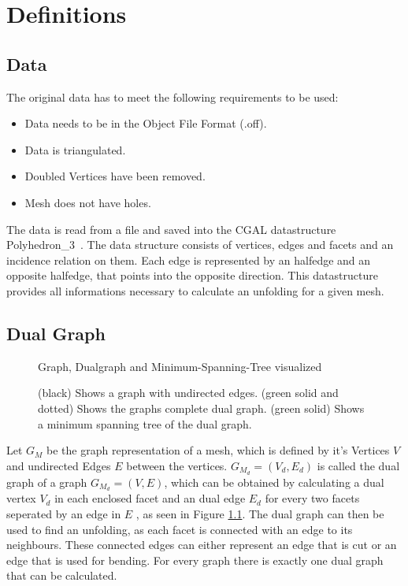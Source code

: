 \documentclass[draft,final]{vutinfth} %
\begin{document}
\chapter{Definitions}
\label{chap:definitions}

\section{Data}

The original data has to meet the following requirements to be used:
\begin{itemize}
	\item Data needs to be in the Object File Format (.off)\cite{offfile}.
	\item Data is triangulated.
	\item Doubled Vertices have been removed.
	\item Mesh does not have holes.
\end{itemize}

The data is read from a file and saved into the CGAL datastructure Polyhedron\_3~\cite{cgal:eb-19a}. The data structure consists of vertices, edges and facets and an incidence relation on them. Each edge is represented by an halfedge and an opposite halfedge, that points into the opposite direction. This datastructure provides all informations necessary to calculate an unfolding for a given mesh.

\section{Dual Graph}

\begin{figure}

\caption{(black) Shows a graph with undirected edges. (green solid and dotted) Shows the graphs complete dual graph. (green solid) Shows a minimum spanning tree of the dual graph.}{Graph, Dualgraph and Minimum-Spanning-Tree visualized}
\label{fig:dualgraph}
\end{figure}

Let $G_M$ be the graph representation of a mesh, which is defined by it's Vertices $V$ and undirected Edges $E$ between the vertices. $G_{M_d} = (V_d, E_d)$ is called the dual graph of a graph $G_{M_d} = (V,E)$, which can be obtained by calculating a dual vertex $V_d$ in each enclosed facet and an dual edge $E_d$ for every two facets seperated by an edge in $E$ \cite{gross2004handbook}, as seen in Figure \ref{fig:dualgraph}. The dual graph can then be used to find an unfolding, as each facet is connected with an edge to its neighbours. These connected edges can either represent an edge that is cut or an edge that is used for bending. For every graph there is exactly one dual graph that can be calculated.
\end{document}
